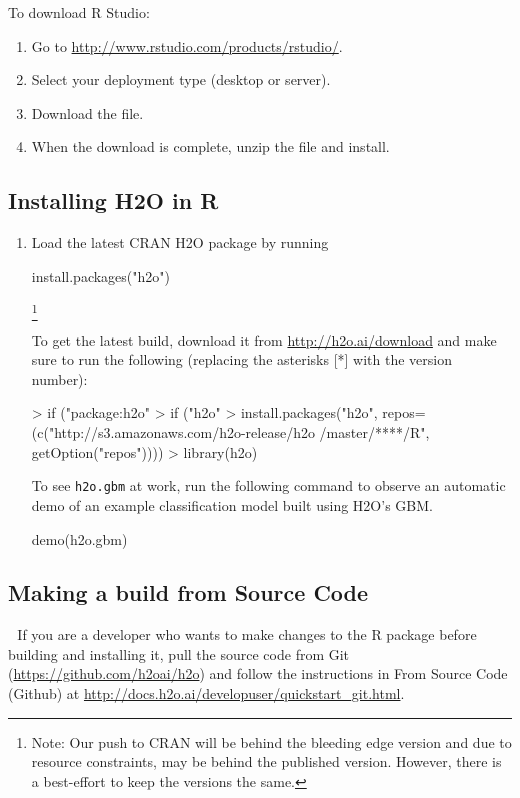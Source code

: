 \documentclass[11pt]{article}
\begin{document}
To download R Studio: 

\begin{enumerate}
\item Go to \url{http://www.rstudio.com/products/rstudio/}. 
\item Select your deployment type (desktop or server). 
\item Download the file. 
\item When the download is complete, unzip the file and install.
\end{enumerate}


\subsection{Installing H2O in R}
\begin{enumerate}
\item Load the latest CRAN H2O package by running \begin{spverbatim} install.packages("h2o") \end{spverbatim}\footnote{Note: Our push to CRAN will be behind the bleeding edge version and due to resource constraints, may be behind the published version. However, there is a best-effort to keep the versions the same.} 

To get the latest build, download it from \url{http://h2o.ai/download} and make sure to run the following (replacing the asterisks [*] with the version number): 
\begin{spverbatim}
> if ("package:h2o" %
> if ("h2o" %
> install.packages("h2o", repos=(c("http://s3.amazonaws.com/h2o-release/h2o
/master/****/R", getOption("repos"))))
> library(h2o)
\end{spverbatim}
To see {\texttt{h2o.gbm}} at work, run the following command to observe an automatic demo of an example classification model built using H2O's GBM.

\begin{spverbatim}
demo(h2o.gbm)
\end{spverbatim}
\end{enumerate}

\subsection{Making a build from Source Code} 
If you are a developer who wants to make changes to the R package before building and installing it, pull the source code from Git (\url{https://github.com/h2oai/h2o}) and follow the instructions in From Source Code (Github) at \url{http://docs.h2o.ai/developuser/quickstart\_git.html}.
\end{document}
